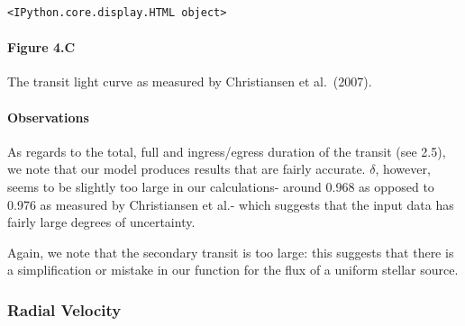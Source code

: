\documentclass[11pt]{article}
\begin{document}
    
    
    \begin{Verbatim}[commandchars=\\\{\}]
<IPython.core.display.HTML object>
    \end{Verbatim}

    
    

    \hypertarget{figure-4.c}{%
\paragraph{Figure 4.C}\label{figure-4.c}}

The transit light curve as measured by Christiansen et al.~(2007).

    \hypertarget{observations}{%
\paragraph{Observations}\label{observations}}

As regards to the total, full and ingress/egress duration of the transit
(see 2.5), we note that our model produces results that are fairly
accurate. \(\delta\), however, seems to be slightly too large in our
calculations- around 0.968 as opposed to 0.976 as measured by
Christiansen et al.- which suggests that the input data has fairly large
degrees of uncertainty.

Again, we note that the secondary transit is too large: this suggests
that there is a simplification or mistake in our function for the flux
of a uniform stellar source.

    \hypertarget{radial-velocity}{%
\subsubsection{Radial Velocity}\label{radial-velocity}}
\end{document}
